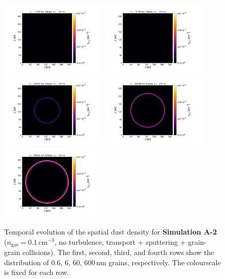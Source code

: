 \documentclass[fleqn,usenatbib]{mnras}
\begin{document}
\begin{figure}
  \includegraphics[trim=2.8cm 1.5cm 9.3cm 2.0cm, clip=true,page=4,height = 3.6cm]{Pics/Pics_A2/Density_1_00041.pdf}\hspace*{-0.05cm} 
 \includegraphics[trim=5.2cm 1.5cm 9.3cm 2.0cm, clip=true,page=4,height = 3.6cm]{Pics/Pics_A2/Density_1_00201.pdf}\hspace*{-0.05cm} 
 \includegraphics[trim=5.2cm 1.5cm 9.3cm 2.0cm, clip=true,page=4,height = 3.6cm]{Pics/Pics_A2/Density_1_00801.pdf}\hspace*{-0.05cm}  
 \includegraphics[trim=5.2cm 1.5cm 9.3cm 2.0cm, clip=true,page=4,height = 3.6cm]{Pics/Pics_A2/Density_1_02001.pdf}\hspace*{-0.05cm} 
 \includegraphics[trim=5.2cm 1.5cm 3.2cm 2.0cm, clip=true,page=4,height = 3.6cm]{Pics/Pics_A2/Density_1_04000.pdf}\\
  \caption{Temporal evolution of the spatial dust density for \textbf{Simulation A-2}  ($n_\text{gas}=0.1\,\text{cm}^{-3}$, no turbulence, transport + sputtering + grain-grain collisions). The first, second, third, and fourth rows show the distribution of 0.6, 6, 60, 600$\,$nm grains, respectively. The colourscale is fixed for each row.}
   \label{fig_A2} 
  \end{figure}   
  
\end{document}
